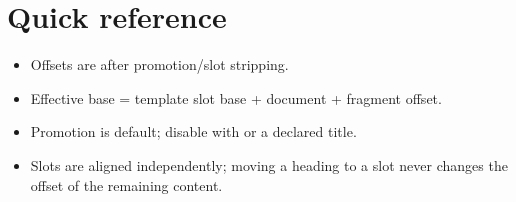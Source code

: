 \documentclass[a4paper,twoside]{article}
\begin{document}
\section{Quick reference}
\begin{itemize}
\item Offsets are  after promotion/slot stripping.
\item Effective base = template slot base + document  + fragment offset.
\item Promotion is default; disable with  or a declared title.
\item Slots are aligned independently; moving a heading to a slot never changes the
offset of the remaining content.
\end{itemize}
\end{document}
